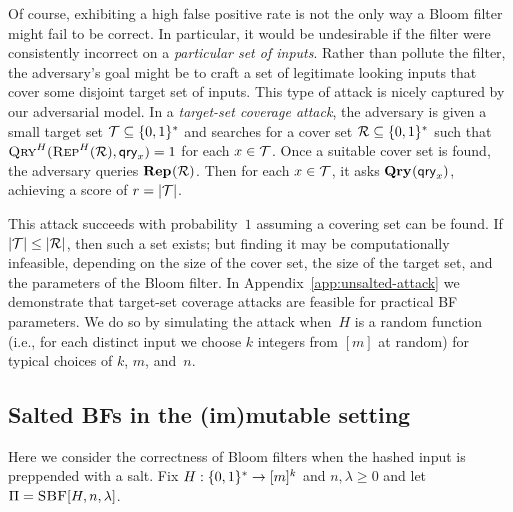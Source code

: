 %
Of course, exhibiting a high false positive rate is not the only way a Bloom
filter might fail to be correct. In particular, it would be undesirable if the
filter were consistently incorrect on a \emph{particular set of inputs}. Rather
than pollute the filter, the adversary's goal might be to craft a set of
legitimate looking inputs that cover some disjoint target set of inputs.
%
This type of attack is nicely captured by our adversarial model.
%
In a \emph{target-set coverage attack}, the adversary is given a small target set
$\mathcal{T}\subseteq\{0,1\}^*$ and searches for a cover set $\mathcal{R}\subseteq\{0,1\}^*$
such that $\textnormal{\textsc{Qry}}^H(\textnormal{\textsc{Rep}}^H(\mathcal{R}),\mathsf{qry}_x)=1$ for each $x\in\mathcal{T}$.
%
Once a suitable cover set is found, the adversary queries $\textup{\textbf{Rep}}\hspace{0.5pt}(\mathcal{R})$. Then
for each $x\in\mathcal{T}$, it asks $\textup{\textbf{Qry}}\hspace{0.5pt}(\mathsf{qry}_x)$, achieving a score of $r = |\mathcal{T}|$.

This  attack succeeds with probability~$1$ assuming a covering set can
be found.  If $|\mathcal{T}| \leq |\mathcal{R}|$, then such a set exists; but finding it may be
computationally infeasible, depending on the size of the cover set, the size of
the target set, and the parameters of the Bloom filter.
%
In Appendix~\ref{app:unsalted-attack} we demonstrate that target-set coverage
attacks are feasible for practical BF parameters. We do so by simulating the
attack when~$H$ is a random function (i.e., for each distinct input we choose
$k$ integers from $[m]$ at random) for typical choices of $k$, $m$, and~$n$.


\subsection{Salted BFs in the (im)mutable setting}
%
Here we consider the correctness of Bloom filters when the hashed input is
preppended with a salt.
%
Fix $H:\{0,1\}^*\to[m]^k$ and $n,\lambda\geq0$ and let
$\Pi = \textnormal{\textsc{SBF}}[H,n,\lambda]$.

